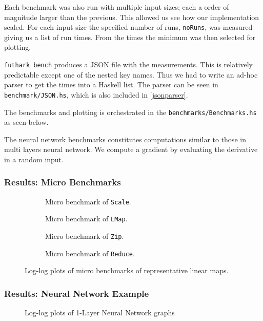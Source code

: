 Each benchmark was also run with multiple input sizes; each a order of magnitude
larger than the previous.  This allowed us see how our implementation scaled.
For each input size the specified number of runs, \texttt{noRuns}, was measured
giving us a list of run times.  From the times the minimum was then selected for
plotting.

\texttt{futhark bench} produces a JSON file with the measurements.  This is
relatively predictable except one of the nested key names.  Thus we had to write
an ad-hoc parser to get the times into a Haskell list.  The parser can be seen in
\texttt{benchmark/JSON.hs}, which is also included in \autoref{jsonparser}.


The benchmarks and plotting is orchestrated in the \texttt{benchmarks/Benchmarks.hs}
as seen below.

The neural network benchmarks constitutes
computations similar to those in multi layers neural network.  We compute
a gradient by evaluating the derivative in a random input.



\pagebreak{}
\subsubsection{Results: Micro Benchmarks}


\begin{figure}[H]
	\centering
        \begin{subfigure}[l]{0.48\textwidth}
          \centering
          
          \caption{Micro benchmark of \texttt{Scale}.
            }\label{fig:scale}
        \end{subfigure}
        \hfill
        \begin{subfigure}[l]{0.48\textwidth}
          \centering
          
          \caption{Micro benchmark of \texttt{LMap}.
            }\label{fig:lmap}
        \end{subfigure}
        \begin{subfigure}[l]{0.48\textwidth}
          \centering
          
          \caption{Micro benchmark of \texttt{Zip}.
            }\label{fig:zip}
        \end{subfigure}
        \begin{subfigure}[l]{0.48\textwidth}
          \centering
          
          \caption{Micro benchmark of \texttt{Reduce}.
            }\label{fig:red}
        \end{subfigure}
        \caption{Log-log plots of micro benchmarks of representative linear maps.}\label{fig:micro}
\end{figure}


\subsubsection{Results:  Neural Network Example}

\begin{figure}[H]
    \centering
    
    \caption{Log-log plots of 1-Layer Neural Network graphs}\label{fig:nns}
\end{figure}
